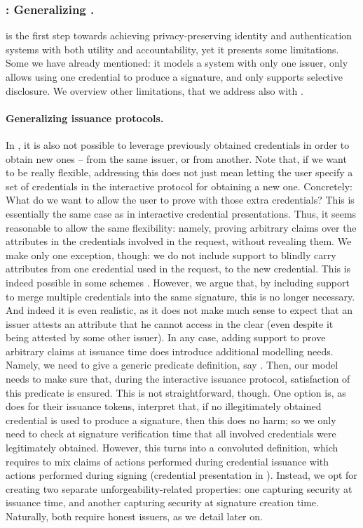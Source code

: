 \subsubsection{\UAS: Generalizing \GSAC.} %
\GSAC is the first step towards achieving privacy-preserving identity and
authentication systems with both utility and accountability, yet it presents
some limitations. Some we have already mentioned: it models a system with only
one issuer, only allows using one credential to produce a signature, and only
supports selective disclosure. We overview other limitations, that we address
also with \UAS.

\paragraph{Generalizing issuance protocols.} %
In \GSAC, it is also not possible to leverage previously obtained credentials in
order to obtain new ones -- from the same issuer, or from another. Note that, if
we want to be really flexible, addressing this does not just mean letting the
user specify a set of credentials in the interactive protocol for obtaining a
new one. Concretely: What do we want to allow the user to prove with those extra
credentials? This is essentially the same case as in interactive credential
presentations. Thus, it seems reasonable to allow the same flexibility: namely,
proving arbitrary claims over the attributes in the credentials involved in the
request, without revealing them. We make only one exception, though: we do not
include support to blindly carry attributes from one credential used in the
request, to the new credential. This is indeed possible in some schemes
\cite{bcl04}. However, we argue that, by including support to merge multiple
credentials into the same signature, this is no longer necessary. And indeed
it is even realistic, as it does not make much sense to expect that an issuer
attests an attribute that he cannot access in the clear (even despite it being
attested by some other issuer). In any case, adding support to prove arbitrary
claims at issuance time does introduce additional modelling needs. Namely, we
need to give a generic predicate definition, say \fissue. Then, our model needs
to make sure that, during the interactive issuance protocol, satisfaction of
this predicate is ensured. This is not straightforward, though. One option is,
as \cite{ckl+15} does for their issuance tokens, interpret that, if no
illegitimately obtained credential is used to produce a signature, then this
does no harm; so we only need to check at signature verification time that all
involved credentials were legitimately obtained. However, this turns into a
convoluted definition, which requires to mix claims of actions performed during
credential issuance with actions performed during signing (credential
presentation in \cite{ckl+15}). Instead, we opt for creating two separate
unforgeability-related properties: one capturing security at issuance time, and
another capturing security at signature creation time. Naturally, both require
honest issuers, as we detail later on.

